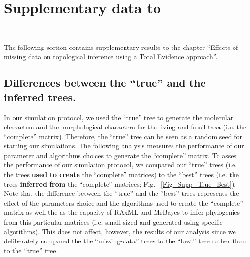 %
%

\chapter{Supplementary data to }
\label{chap:Appendix_TEM_paper}

\bigskip
\medskip
\begin{center}

 \\
\bigskip
\end{center}

The following section contains supplementary results to the chapter ``Effects of missing data on topological inference using a Total Evidence approach''.

\section*{Differences between the ``true'' and the inferred trees.}

In our simulation protocol, we used the ``true'' tree to generate the molecular characters and the morphological characters for the living and fossil taxa (i.e. the ``complete'' matrix).
Therefore, the ``true'' tree can be seen as a random seed for starting our simulations.
The following analysis measures the performance of our parameter and algorithms choices to generate the ``complete'' matrix.
To asses the performance of our simulation protocol, we compared our ``true'' trees (i.e. the trees \textbf{used to create} the ``complete'' matrices) to the ``best'' trees (i.e. the trees \textbf{inferred from} the ``complete'' matrices; Fig. ~\ref{Fig_Supp_True_Best}).
Note that the difference between the ``true'' and the ``best'' trees represents the effect of the parameters choice and the algorithms used to create the ``complete'' matrix as well the as the capacity of RAxML and MrBayes to infer phylogenies from this particular matrices (i.e. small sized and generated using specific algorithms).
This does not affect, however, the results of our analysis since we deliberately compared the the ``missing-data'' trees to the ``best'' tree rather than to the ``true'' tree. 

